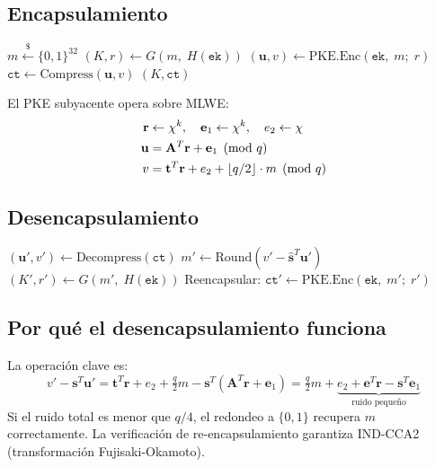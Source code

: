 \documentclass[12pt,a4paper,twoside,openright]{book}
\theoremstyle{plain}
\theoremstyle{definition}
\theoremstyle{remark}
\newcommand{\vv}[1]{\mathbf{#1}}
\newcommand{\mm}[1]{\mathbf{#1}}
\newcommand{\MLKEM}{\textsf{ML-KEM}}
\newcommand{\Encaps}{\mathsf{Encaps}}
\newcommand{\Decaps}{\mathsf{Decaps}}
\begin{document}
\subsection{Encapsulamiento}

\begin{algorithm}[H]
\caption{$\MLKEM.\Encaps(\mathtt{ek})$}
\label{alg:mlkem_encaps}
$m \xleftarrow{\$} \{0,1\}^{32}$
$(K, r) \leftarrow G(m,\; H(\mathtt{ek}))$
$(\vv{u}, v) \leftarrow \mathrm{PKE.Enc}(\mathtt{ek},\; m;\; r)$
$\mathtt{ct} \leftarrow \mathrm{Compress}(\vv{u}, v)$\;
\Return $(K, \mathtt{ct})$
\end{algorithm}

El PKE subyacente opera sobre MLWE:
\begin{align}
  \vv{r} &\leftarrow \chi^k, \quad \vv{e}_1 \leftarrow \chi^k, \quad e_2 \leftarrow \chi \notag\\
  \vv{u} &= \mm{A}^T \vv{r} + \vv{e}_1 \pmod{q}\\
  v      &= \vv{t}^T \vv{r} + e_2 + \lfloor q/2 \rfloor \cdot m \pmod{q}
\end{align}

\subsection{Desencapsulamiento}

\begin{algorithm}[H]
\caption{$\MLKEM.\Decaps(\mathtt{dk}, \mathtt{ct})$}
\label{alg:mlkem_decaps}
$(\vv{u}', v') \leftarrow \mathrm{Decompress}(\mathtt{ct})$\;
$m' \leftarrow \mathrm{Round}(v' - \hat{\vv{s}}^T \vv{u}')$
$(K', r') \leftarrow G(m',\; H(\mathtt{ek}))$\;
Reencapsular: $\mathtt{ct}' \leftarrow \mathrm{PKE.Enc}(\mathtt{ek},\; m';\; r')$\;
\end{algorithm}

\subsection{Por qu\'e el desencapsulamiento funciona}

La operaci\'on clave es:
\[
  v' - \vv{s}^T \vv{u}'
  = \vv{t}^T\vv{r} + e_2 + \tfrac{q}{2}m - \vv{s}^T(\mm{A}^T\vv{r} + \vv{e}_1)
  = \tfrac{q}{2}m + \underbrace{e_2 + \vv{e}^T\vv{r} - \vv{s}^T\vv{e}_1}_{\text{ruido peque\~no}}
\]
Si el ruido total es menor que $q/4$, el redondeo a $\{0,1\}$ recupera $m$
correctamente. La verificaci\'on de re-encapsulamiento garantiza IND-CCA2
(transformaci\'on Fujisaki-Okamoto).
\end{document}
